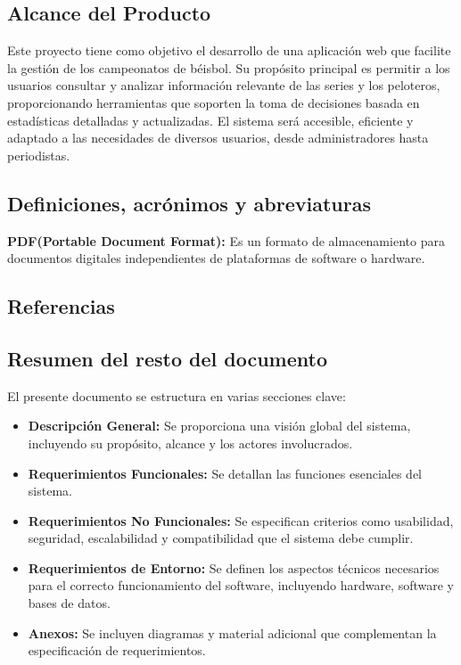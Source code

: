 \documentclass{report}
\begin{document}
        \subsection*{Alcance del Producto}

        Este proyecto tiene como objetivo el desarrollo de una aplicación web que facilite la gestión de los 
        campeonatos de béisbol. Su propósito principal es permitir a los usuarios consultar y analizar información 
        relevante de las series y los peloteros, proporcionando herramientas que soporten la toma de decisiones 
        basada en estadísticas detalladas y actualizadas. El sistema será accesible, eficiente y adaptado a las 
        necesidades de diversos usuarios, desde administradores hasta periodistas.


        \subsection*{Definiciones, acrónimos y abreviaturas}
        \textbf{PDF(Portable Document Format):} Es un formato de almacenamiento para documentos 
        digitales independientes de plataformas de software o hardware.

        \subsection*{Referencias}

        \subsection*{Resumen del resto del documento}
        El presente documento se estructura en varias secciones clave:

        \begin{itemize}
            \item \textbf{Descripción General:} Se proporciona una visión global del sistema, incluyendo su propósito, alcance y los actores involucrados.
            \item \textbf{Requerimientos Funcionales:} Se detallan las funciones esenciales del sistema.
            \item \textbf{Requerimientos No Funcionales:} Se especifican criterios como usabilidad, seguridad, escalabilidad y compatibilidad que el sistema debe cumplir.
            \item \textbf{Requerimientos de Entorno:} Se definen los aspectos técnicos necesarios para el correcto funcionamiento del software, incluyendo hardware, software y bases de datos.
            \item \textbf{Anexos:} Se incluyen diagramas y material adicional que complementan la especificación de requerimientos.
        \end{itemize}
\end{document}
